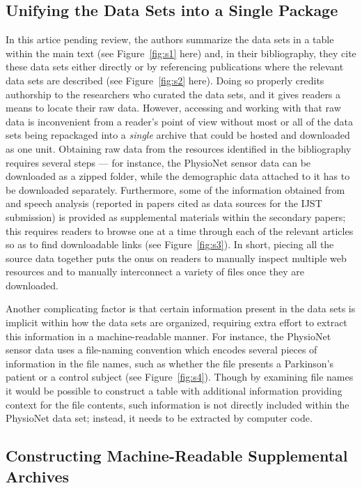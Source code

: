 \documentclass[12pt,letterpaper]{article}
\newcommand{\MRI}{\resizebox{!}{8pt}{\AcronymText{MRI}}}
\newcommand{\textscc}[1]{{\color{orr!35!black}{{%
{\textsc{\textbf{#1}}}}}}}
\newcommand{\AcronymText}[1]{{\textscc{#1}}}
\newcommand{\p}[1]{

\vspace{.7em}#1}
\begin{document}
{\subsection{Unifying the Data Sets into a Single Package}  
\p{In this artice pending review, the authors summarize the data sets 
in a table within the main text 
(see Figure~\ref{fig:s1} here) and, in their bibliography, they 
cite these data sets either directly or by 
referencing publications where the relevant data sets are described 
(see Figure~\ref{fig:s2} here).  Doing so properly 
credits authorship to the researchers who curated the data sets, and it gives readers a 
means to locate their raw data.  However, accessing and working with that raw data is 
inconvenient from a reader's point of view without most or all of the data sets being 
repackaged into a \textit{single} archive that could be hosted and downloaded as one unit.  
Obtaining raw data from the resources identified in the bibliography requires 
several steps --- for instance, the PhysioNet sensor data can be downloaded 
as a zipped folder, while the demographic data attached to it has to be downloaded 
separately.  Furthermore, some of the information obtained from \MRI{} and speech analysis 
(reported in papers cited as data sources for the IJST submission) is provided 
as supplemental materials within the secondary papers; this requires readers 
to browse one at a time through each of the relevant articles so as to find 
downloadable links (see Figure~\ref{fig:s3}).  In short, piecing all 
the source data together puts the onus on readers to manually inspect multiple 
web resources and to manually interconnect a variety of files once they are downloaded.}

\p{Another complicating factor is that certain information present in the data sets 
is implicit within how the data sets are organized, requiring extra effort to 
extract this information in a machine-readable manner.  For instance, the PhysioNet 
sensor data uses a file-naming convention which encodes several pieces of 
information in the file names, such as whether the file presents a Parkinson's patient 
or a control subject (see Figure~\ref{fig:s4}).  
Though by examining file names it would be possible to construct a 
table with additional information providing context for the file contents, 
such information is not directly included within the PhysioNet data set; instead, it 
needs to be extracted by computer code.}


\subsection{Constructing Machine-Readable Supplemental Archives}

}
\end{document}
